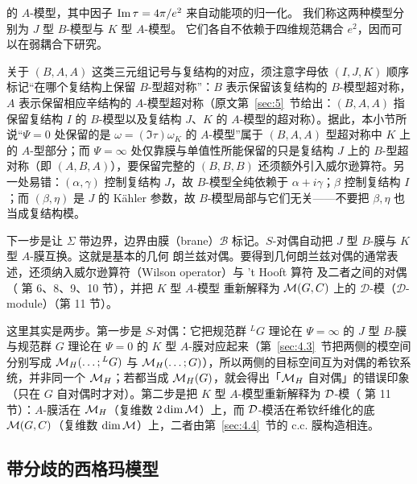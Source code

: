 的 $A$-模型，其中因子 ${\rm Im}\,\tau={4\pi/e^2}$ 来自动能项的归一化。
我们称这两种模型分别为 $J$ 型 $B$-模型与 $K$ 型 $A$-模型。
它们各自不依赖于四维规范耦合 $e^2$，因而可以在弱耦合下研究。

\begin{yizhu}[易错点]
关于 $(B,A,A)$ 这类三元组记号与复结构的对应，须注意字母依 $(I,J,K)$ 顺序标记“在哪个复结构上保留 $B$-型超对称”：$B$ 表示保留该复结构的 $B$-模型超对称，$A$ 表示保留相应辛结构的 $A$-模型超对称（原文第~\ref{sec:5}~节给出：$(B,A,A)$ 指保留复结构 $I$ 的 $B$-模型以及复结构 $J$、$K$ 的 $A$-模型的超对称）。据此，本小节所说“$\Psi=0$ 处保留的是 $\omega=(\Im\tau)\omega_K$ 的 $A$-模型”属于 $(B,A,A)$ 型超对称中 $K$ 上的 $A$-型部分；而 $\Psi=\infty$ 处仅靠膜与单值性所能保留的只是复结构 $J$ 上的 $B$-型超对称（即 $(A,B,A)$），要保留完整的 $(B,B,B)$ 还须额外引入威尔逊算符。另一处易错：$(\alpha,\gamma)$ 控制复结构 $J$，故 $B$-模型全纯依赖于 $\alpha+i\gamma$；$\beta$ 控制复结构 $I$；而 $(\beta,\eta)$ 是 $J$ 的 Kähler 参数，故 $B$-模型局部与它们无关——不要把 $\beta,\eta$ 也当成复结构模。
\end{yizhu}

下一步是让 $\Sigma$ 带边界，边界由膜（brane）$\mathcal B$ 标记。$S$-对偶自动把
$J$ 型 $B$-膜与 $K$ 型 $A$-膜互换。这就是基本的几何
朗兰兹对偶。要得到几何朗兰兹对偶的通常表述，还须纳入威尔逊算符（Wilson operator）与 't Hooft 算符
及二者之间的对偶（\cite{ref8} 第 6、8、9、10 节），并把 $K$ 型 $A$-模型
重新解释为 ${\mathcal{M}}(G,C)$ 上的 ${\mathcal D}$-模（${\mathcal D}$-module）（第 11 节）。

\begin{yizhu}[易错点]
这里其实是两步。第一步是 $S$-对偶：它把规范群 $^LG$ 理论在 $\Psi=\infty$ 的 $J$ 型 $B$-膜与规范群 $G$ 理论在 $\Psi=0$ 的 $K$ 型 $A$-膜对应起来（第~\ref{sec:4.3}~节把两侧的模空间分别写成 ${{\mathcal{M}}_H}(\dots;{}^LG)$ 与 ${{\mathcal{M}}_H}(\dots;G)$），所以两侧的目标空间互为对偶的希钦系统，并非同一个 ${{\mathcal{M}}_H}$；若都当成 ${{\mathcal{M}}_H}(G)$，就会得出「${{\mathcal{M}}_H}$ 自对偶」的错误印象（只在 $G$ 自对偶时才对）。第二步是把 $K$ 型 $A$-模型重新解释为 ${\mathcal D}$-模（\cite{ref8} 第 11 节）：$A$-膜活在 ${{\mathcal{M}}_H}$（复维数 $2\dim{\mathcal{M}}$）上，而 ${\mathcal D}$-模活在希钦纤维化的底 ${\mathcal{M}}(G,C)$（复维数 $\dim{\mathcal{M}}$）上，二者由第~\ref{sec:4.4}~节的 c.c. 膜构造相连。
\end{yizhu}

\subsection{带分歧的西格玛模型}

\label{sec:4.2}

